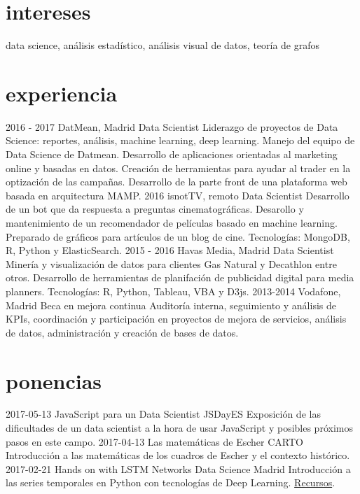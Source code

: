 \documentclass[]{friggeri-cv}
\begin{document}
\section{intereses}

data science, análisis estadístico, análisis visual de datos, teoría de grafos

\section{experiencia}

\begin{entrylist}
    \entry
    {2016 - 2017}
    {DatMean, Madrid}
    {Data Scientist}
    {Liderazgo de proyectos de Data Science: reportes, análisis, machine learning, deep learning. Manejo del equipo de Data Science de Datmean. Desarrollo de aplicaciones orientadas al marketing online y basadas en datos. Creación de herramientas para ayudar al trader en la optización de las campañas. Desarrollo de la parte front de una plataforma web basada en arquitectura MAMP.}
  \entry
    {2016}
    {isnotTV, remoto}
    {Data Scientist}
    {Desarrollo de un bot que da respuesta a preguntas cinematográficas. Desarollo y mantenimiento de un recomendador de películas basado en machine learning. Preparado de gráficos para artículos de un blog de cine. Tecnologías: MongoDB, R, Python y ElasticSearch.}
  \entry
    {2015 - 2016}
    {Havas Media, Madrid}
    {Data Scientist}
    {Minería y visualización de datos para clientes Gas Natural y Decathlon entre otros. Desarrollo de herramientas de planifación de publicidad digital para media planners. Tecnologías: R, Python, Tableau, VBA y D3js.}
  \entry
    {2013-2014}
    {Vodafone, Madrid}
    {Beca en mejora continua}
    {Auditoría interna, seguimiento y análisis de KPIs, coordinación y participación en proyectos de mejora de servicios, análisis de datos, administración y creación de bases de datos.}
\end{entrylist}

\section{ponencias}

\begin{entrylist}
  \entry
    {2017-05-13}
    {JavaScript para un Data Scientist}
    {JSDayES}
    {Exposición de las dificultades de un data scientist a la hora de usar JavaScript y posibles próximos pasos en este campo.}
  \entry
    {2017-04-13}
    {Las matemáticas de Escher}
    {CARTO}
    {Introducción a las matemáticas de los cuadros de Escher y el contexto histórico.}
  \entry
    {2017-02-21}
    {Hands on with LSTM Networks}
    {Data Science Madrid}
    {Introducción a las series temporales en Python con tecnologías de Deep Learning. \href{https://github.com/chucheria/20170221_DSM-Workbook}{Recursos}.}
\end{entrylist}
\end{document}
